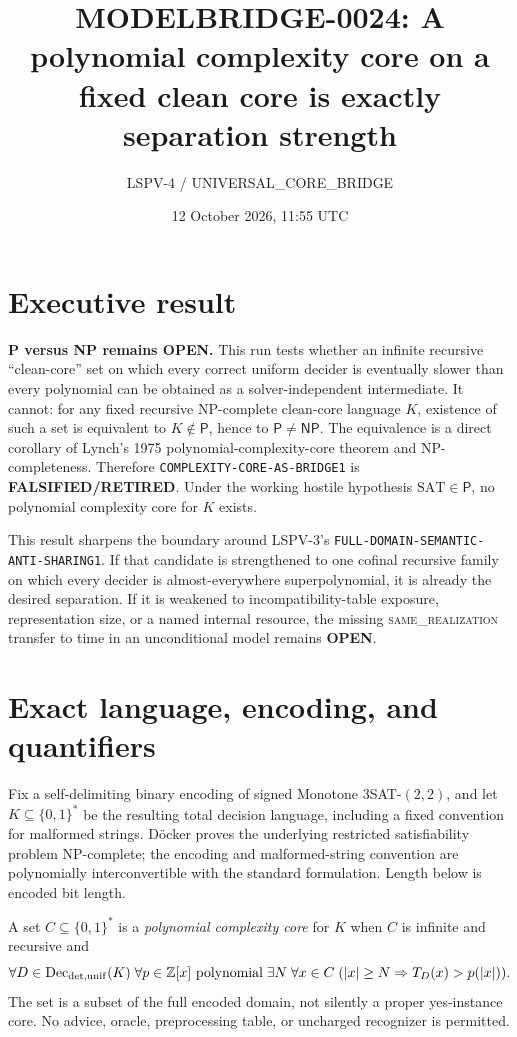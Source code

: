 \documentclass[11pt]{article}
\title{MODELBRIDGE-0024: A polynomial complexity core on a fixed clean core is exactly separation strength}
\author{LSPV-4 / UNIVERSAL\_CORE\_BRIDGE}
\date{12 October 2026, 11:55 UTC}
\newcommand{\Pclass}{\mathsf P}
\newcommand{\NPclass}{\mathsf{NP}}
\newcommand{\OPEN}{\textbf{OPEN}}
\newcommand{\RETIRED}{\textbf{FALSIFIED/RETIRED}}
\begin{document}
\maketitle

\section*{Executive result}
\textbf{P versus NP remains OPEN.}  This run tests whether an infinite
recursive ``clean-core'' set on which every correct uniform decider is
eventually slower than every polynomial can be obtained as a
solver-independent intermediate.  It cannot: for any fixed recursive
NP-complete clean-core language \(K\), existence of such a set is equivalent
to \(K\notin\Pclass\), hence to \(\Pclass\ne\NPclass\).  The equivalence is a
direct corollary of Lynch's 1975 polynomial-complexity-core theorem and
NP-completeness.  Therefore
\texttt{COMPLEXITY-CORE-AS-BRIDGE1} is \RETIRED.  Under the working hostile
hypothesis \(\mathrm{SAT}\in\Pclass\), no polynomial complexity core for
\(K\) exists.

This result sharpens the boundary around LSPV-3's
\texttt{FULL-DOMAIN-SEMANTIC-ANTI-SHARING1}.  If that candidate is
strengthened to one cofinal recursive family on which every decider is
almost-everywhere superpolynomial, it is already the desired separation.  If
it is weakened to incompatibility-table exposure, representation size, or a
named internal resource, the missing \textsc{same\_realization} transfer to
time in an unconditional model remains \OPEN.

\section{Exact language, encoding, and quantifiers}
Fix a self-delimiting binary encoding of signed Monotone
\(3\)SAT-\((2,2)\), and let \(K\subseteq\{0,1\}^*\) be the resulting total
decision language, including a fixed convention for malformed strings.
D\"ocker proves the underlying restricted satisfiability problem NP-complete;
the encoding and malformed-string convention are polynomially interconvertible
with the standard formulation.  Length below is encoded bit length.

A set \(C\subseteq\{0,1\}^*\) is a \emph{polynomial complexity core} for
\(K\) when \(C\) is infinite and recursive and
\[
 \forall D\in\operatorname{Dec}_{\rm det,unif}(K)\;
 \forall p\in\mathbb Z[x]\text{ polynomial}\;
 \exists N\;\forall x\in C\;( |x|\ge N\Rightarrow T_D(x)>p(|x|)).
\]
The set is a subset of the full encoded domain, not silently a proper
yes-instance core.  No advice, oracle, preprocessing table, or uncharged
recognizer is permitted.
\end{document}
